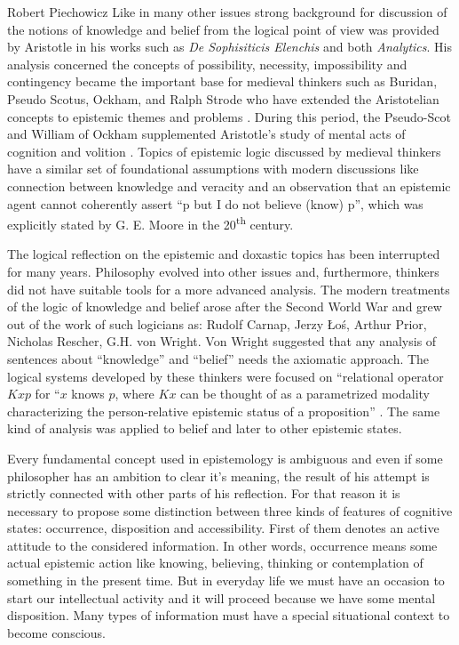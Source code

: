 \begin{artengenv}{Robert Piechowicz}
\indent Like in many other issues strong background for discussion of the notions of knowledge and belief from the logical point of view was provided by Aristotle in his works such as \textit{De Sophisiticis Elenchis} and both \textit{Analytics}. His analysis concerned the concepts of possibility, necessity, impossibility and contingency  became the important base for medieval thinkers such as Buridan, Pseudo Scotus, Ockham, and Ralph Strode who have extended the Aristotelian concepts to epistemic themes and problems \parencites[see][]{boh_epistemic_1993}{knuuttila_modalities_1993}.
During this period, the Pseudo-Scot and William of Ockham supplemented Aristotle’s study of mental acts of cognition and volition
\parencite[see][p.130]{boh_epistemic_1993}.
Topics of epistemic logic discussed by medieval thinkers have a similar set of foundational assumptions with modern discussions like connection between knowledge and veracity and an observation that an epistemic agent cannot coherently assert ``p but I do not believe (know) p'', which was explicitly stated  by G. E. Moore in the 20\textsuperscript{th} century.

The logical reflection on the epistemic and doxastic topics has been interrupted for many years. Philosophy evolved into other issues and, furthermore, thinkers did not have suitable tools for a more advanced analysis. The modern treatments of the logic of knowledge and belief arose after the Second World War and grew out of the work of such logicians as: Rudolf Carnap, Jerzy \L{}o\'{s}, Arthur Prior, Nicholas Rescher, G.H. von Wright. Von Wright suggested that any analysis of sentences about ``knowledge'' and ``belief'' needs the axiomatic approach. The logical systems developed by these thinkers were focused on ``relational operator $Kxp$ for ``$x$ knows $p$, where $Kx$ can be thought of as a parametrized modality characterizing  the person-relative epistemic status of a proposition''
\parencite[][p.478]{jacquette_epistemic_2002}.
The same kind of analysis was applied to belief and later to other epistemic states.

	Every fundamental concept used in epistemology is ambiguous and even if some philosopher has an ambition to clear it’s meaning, the result of his attempt is strictly connected with other parts of his reflection. For that reason it is necessary to propose some distinction between three kinds of features of cognitive states: occurrence, disposition and accessibility. First of them denotes an active attitude to the considered information. In other words, occurrence means some actual epistemic action like knowing, believing, thinking or contemplation of something in the present time. But in everyday life we must have an occasion to start our intellectual activity and it will proceed because we have some mental disposition. Many types of information must have a special situational context to become conscious. 


\end{artengenv}
